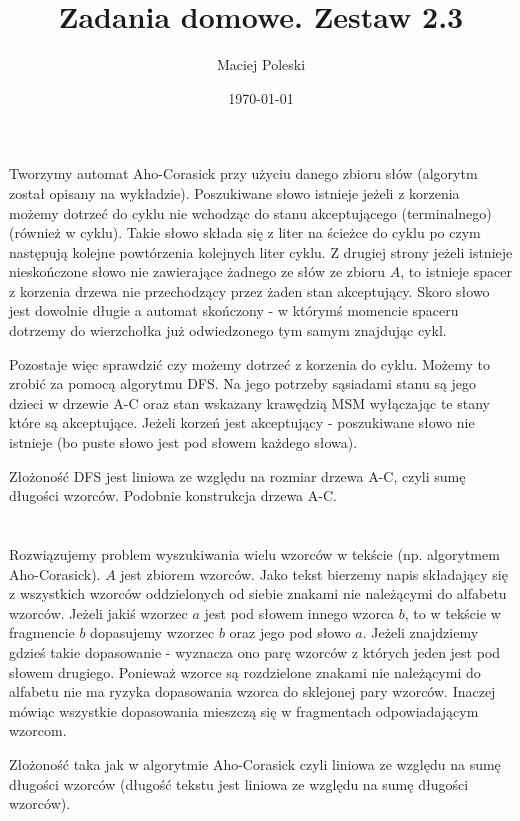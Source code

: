 \documentclass[a4paper,12pt]{article}
\title{Zadania domowe. Zestaw 2.3}
\author{Maciej Poleski}
\date{\today}
\begin{document}
\maketitle

\newpage

\section{}
Tworzymy automat Aho-Corasick przy użyciu danego zbioru słów (algorytm został opisany na wykładzie). Poszukiwane słowo istnieje jeżeli z korzenia możemy dotrzeć do cyklu nie wchodząc do stanu akceptującego (terminalnego) (również w cyklu). Takie słowo składa się z liter na ścieżce do cyklu po czym następują kolejne powtórzenia kolejnych liter cyklu. Z drugiej strony jeżeli istnieje nieskończone słowo nie zawierające żadnego ze słów ze zbioru $A$, to istnieje spacer z korzenia drzewa nie przechodzący przez żaden stan akceptujący. Skoro słowo jest dowolnie długie a automat skończony - w którymś momencie spaceru dotrzemy do wierzchołka już odwiedzonego tym samym znajdując cykl.

Pozostaje więc sprawdzić czy możemy dotrzeć z korzenia do cyklu. Możemy to zrobić za pomocą algorytmu DFS. Na jego potrzeby sąsiadami stanu są jego dzieci w drzewie A-C oraz stan wskazany krawędzią MSM wyłączając te stany które są akceptujące. Jeżeli korzeń jest akceptujący - poszukiwane słowo nie istnieje (bo puste słowo jest pod słowem każdego słowa).

Złożoność DFS jest liniowa ze względu na rozmiar drzewa A-C, czyli sumę długości wzorców. Podobnie konstrukcja drzewa A-C.

\section{}
Rozwiązujemy problem wyszukiwania wielu wzorców w tekście (np. algorytmem Aho-Corasick). $A$ jest zbiorem wzorców. Jako tekst bierzemy napis składający się z wszystkich wzorców oddzielonych od siebie znakami nie należącymi do alfabetu wzorców. Jeżeli jakiś wzorzec $a$ jest pod słowem innego wzorca $b$, to w tekście w fragmencie $b$ dopasujemy wzorzec $b$ oraz jego pod słowo $a$. Jeżeli znajdziemy gdzieś takie dopasowanie - wyznacza ono parę wzorców z których jeden jest pod słowem drugiego. Ponieważ wzorce są rozdzielone znakami nie należącymi do alfabetu nie ma ryzyka dopasowania wzorca do sklejonej pary wzorców. Inaczej mówiąc wszystkie dopasowania mieszczą się w fragmentach odpowiadającym wzorcom.

Złożoność taka jak w algorytmie Aho-Corasick czyli liniowa ze względu na sumę długości wzorców (długość tekstu jest liniowa ze względu na sumę długości wzorców).
\end{document}
